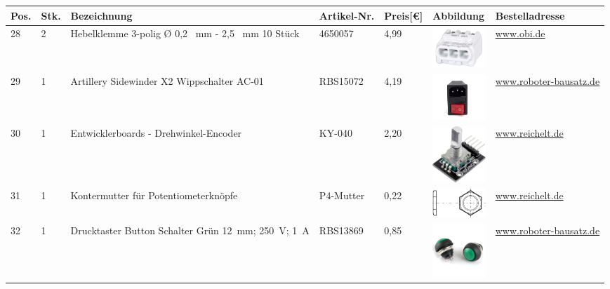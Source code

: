 \begin{center}
\begin{tabularx}{\textwidth}{|p{0.4cm}|p{0.4cm}|X|X|p{1cm}|X|X|}
			\end{tabularx}


	\fontsize{8}{10}\selectfont
	\begin{tabularx}{\textwidth}{|p{0.4cm}|p{0.4cm}|X|X|p{1cm}|X|X|}
	\hline 
	\textbf{Pos.} & \textbf{Stk.} & \textbf{Bezeichnung} & \textbf{Artikel-Nr.}& \textbf{Preis[€]} & \textbf{Abbildung} & \textbf{Bestelladresse} \\ \hline		
	28 & 2 & Hebelklemme 3-polig Ø 0,2 \ mm - 2,5 \ mm 10 Stück & 4650057 & 4,99  & \includegraphics[width=2cm]{Images/Material/4650057.png} & \href{https://www.obi.de/p/4650057/hebelklemme-3-polig-0-2-mm-2-5-mm-10-stueck}{www.obi.de} \\
	\hline
	29 & 1 & Artillery Sidewinder X2 Wippschalter AC-01 & RBS15072 & 4,19  & \includegraphics[width=2cm]{Images/Material/RBS15072.jpg} & \href{https://www.roboter-bausatz.de/p/artillery-sidewinder-x2-wippschalter-ac-01}{www.roboter-bausatz.de} \\
	\hline
	30 & 1 & Entwicklerboards - Drehwinkel-Encoder & KY-040 & 2,20  & \includegraphics[width=2cm]{Images/Material/DEBOENCODER.png} & \href{https://www.reichelt.de/sg/de/entwicklerboards-drehwinkel-encoder-ky-040-debo-encoder-p282545.html}{www.reichelt.de} \\
	\hline
	31 & 1 & Kontermutter für Potentiometerknöpfe & P4-Mutter & 0,22  & \includegraphics[width=2cm]{Images/Material/ENCMUTTER.png} & \href{https://www.reichelt.de/sg/de/kontermutter-fuer-potentiometerknoepfe-schwarz-p4-mutter-p13757.html}{www.reichelt.de} \\
	\hline
	32 & 1 & Drucktaster Button Schalter Grün 12\ mm; 250\ V; 1\ A  & RBS13869 & 0,85  & \includegraphics[width=2cm]{Images/Material/Taster.jpg} & \href{https://www.roboter-bausatz.de/p/drucktaster-button-schalter-gruen-12mm-250v-1a}{www.roboter-bausatz.de} \\

\end{tabularx}
\end{center}
